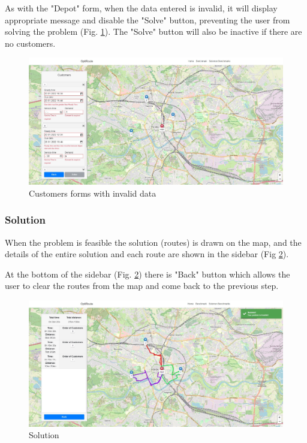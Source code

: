 \documentclass[a4paper,twoside,12pt]{book}
\begin{document}
As with the "Depot" form, when the data entered is invalid, it will display appropriate message and disable the "Solve" button, preventing the user from solving the problem (Fig. \ref{fig:invalidCustomers}). The "Solve" button will also be inactive if there are no customers.

\begin{figure}[H]
\centering
\includegraphics[width=\textwidth]{images/invalidCustomers.jpg}
\caption{Customers forms with invalid data}
\label{fig:invalidCustomers}
\end{figure}

\subsubsection{Solution}
When the problem is feasible the solution (routes) is drawn on the map, and the details of the entire solution and each route are shown in the sidebar (Fig \ref{fig:solution}).



At the bottom of the sidebar (Fig. \ref{fig:solution}) there is "Back" button which allows the user to clear the routes from the map and come back to the previous step.

\begin{figure}[H]
\centering
\includegraphics[width=\textwidth]{images/solution.jpg}
\caption{Solution}
\label{fig:solution}
\end{figure}
\end{document}
